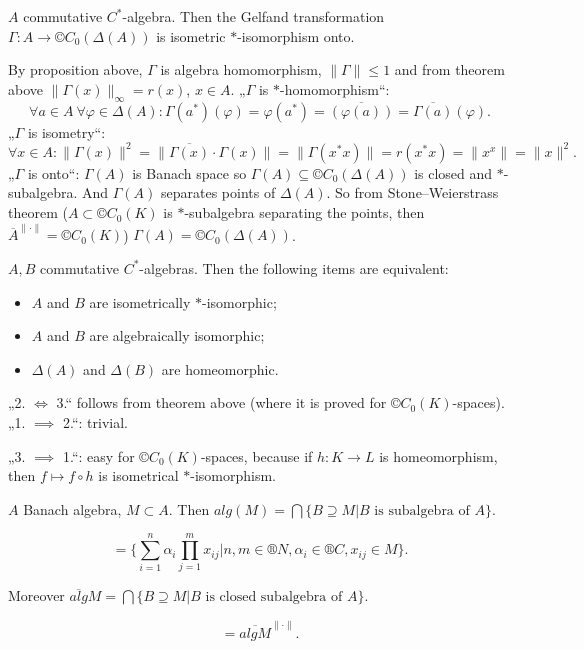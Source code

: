 \documentclass[12pt]{article}					%
\begin{document}
\begin{veta}
	$A$ commutative $C^*$-algebra. Then the Gelfand transformation $Γ: A \rightarrow ©C_0(Δ(A))$ is isometric $*$-isomorphism onto.

	\begin{dukazin}
		By proposition above, $Γ$ is algebra homomorphism, $\|Γ\| ≤ 1$ and from theorem above $\|Γ(x)\|_∞ = r(x)$, $x \in A$. „$Γ$ is $*$-homomorphism“:
		$$ \forall a \in A\ \forall φ \in Δ(A): Γ(a^*)(φ) = φ(a^*) = \overline{(φ(a))} = \overline{Γ(a)}(φ). $$
		„$Γ$ is isometry“:
		$$ \forall x \in A: \|Γ(x)\|^2 = \|\overline{Γ(x)}·Γ(x)\| = \|Γ(x^*x)\| = r(x^*x) = \|x^x\| = \|x\|^2. $$
		„$Γ$ is onto“: $Γ(A)$ is Banach space so $Γ(A) \subseteq ©C_0(Δ(A))$ is closed and $*$-subalgebra. And $Γ(A)$ separates points of $Δ(A)$. So from Stone–Weierstrass theorem ($A \subset ©C_0(K)$ is $*$-subalgebra separating the points, then $\overline{A}^{\|·\|} = ©C_0(K)$) $Γ(A) = ©C_0(Δ(A))$.
	\end{dukazin}
\end{veta}

\begin{dusledek}
	$A, B$ commutative $C^*$-algebras. Then the following items are equivalent:\vspace{-1em}
	\begin{itemize}
		\item $A$ and $B$ are isometrically $*$-isomorphic;
		\item $A$ and $B$ are algebraically isomorphic;
		\item $Δ(A)$ and $Δ(B)$ are homeomorphic.
	\end{itemize}

	\begin{dukazin}
		„2. $\Leftrightarrow$ 3.“ follows from theorem above (where it is proved for $©C_0(K)$-spaces). „1. $\implies$ 2.“: trivial.

		„3. $\implies$ 1.“: easy for $©C_0(K)$-spaces, because if $h: K \rightarrow L$ is homeomorphism, then $f \mapsto f \circ h$ is isometrical $*$-isomorphism.
	\end{dukazin}
\end{dusledek}

\begin{definice}
	$A$ Banach algebra, $M \subset A$. Then $alg(M) = \bigcap \{B \supseteq M | B \text{ is subalgebra of } A\}$.

	\begin{poznamka}[Easy]
		$$ = \{\sum_{i=1}^n \alpha_i \prod_{j=1}^m x_{ij} | n, m \in ®N, \alpha_i \in ®C, x_{ij} \in M\}. $$
	\end{poznamka}

	Moreover $\overline{alg} M = \bigcap \{B \supseteq M | B \text{ is closed subalgebra of } A\}$.

	\begin{poznamka}[Easy]
		$$ = \overline{alg M}^{\|·\|}. $$
	\end{poznamka}
\end{definice}
\end{document}
